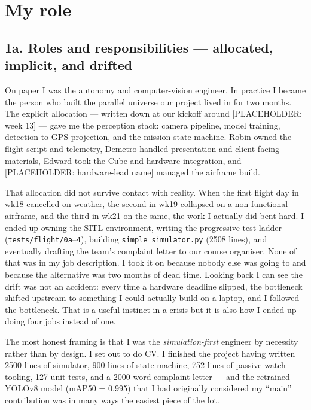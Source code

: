 \section{My role}

\subsection*{1a. Roles and responsibilities --- allocated, implicit, and drifted}

On paper I was the autonomy and computer-vision engineer. In practice I became the person who built the parallel universe our project lived in for two months. The explicit allocation --- written down at our kickoff around [PLACEHOLDER: week 13] --- gave me the perception stack: camera pipeline, model training, detection-to-GPS projection, and the mission state machine. Robin owned the flight script and telemetry, Demetro handled presentation and client-facing materials, Edward took the Cube and hardware integration, and [PLACEHOLDER: hardware-lead name] managed the airframe build.

That allocation did not survive contact with reality. When the first flight day in wk18 cancelled on weather, the second in wk19 collapsed on a non-functional airframe, and the third in wk21 on the same, the work I actually did bent hard. I ended up owning the SITL environment, writing the progressive test ladder (\texttt{tests/flight/0a}--\texttt{4}), building \texttt{simple\_simulator.py} (2508 lines), and eventually drafting the team's complaint letter to our course organiser. None of that was in my job description. I took it on because nobody else was going to and because the alternative was two months of dead time. Looking back I can see the drift was not an accident: every time a hardware deadline slipped, the bottleneck shifted upstream to something I could actually build on a laptop, and I followed the bottleneck. That is a useful instinct in a crisis but it is also how I ended up doing four jobs instead of one.

The most honest framing is that I was the \emph{simulation-first} engineer by necessity rather than by design. I set out to do CV. I finished the project having written 2500 lines of simulator, 900 lines of state machine, 752 lines of passive-watch tooling, 127 unit tests, and a 2000-word complaint letter --- and the retrained YOLOv8 model (mAP50 = 0.995) that I had originally considered my ``main'' contribution was in many ways the easiest piece of the lot.

